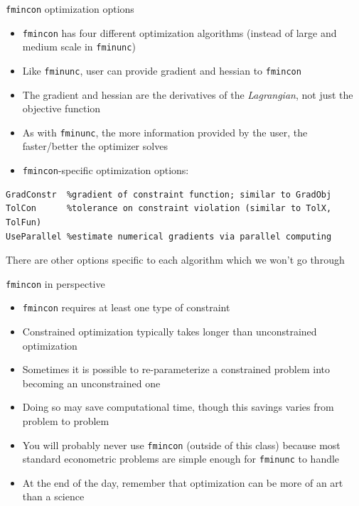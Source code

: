 \documentclass[english,xcolor=dvipsnames]{beamer}
\begin{document}
\begin{frame}[fragile]{\texttt{fmincon} optimization options}
\begin{itemize}
	\item \texttt{fmincon} has four different optimization algorithms (instead of large and medium scale in \texttt{fminunc})
	\item Like \texttt{fminunc}, user can provide gradient and hessian to \texttt{fmincon}
	\item The gradient and hessian are the derivatives of the \emph{Lagrangian}, not just the objective function
	\item As with \texttt{fminunc}, the more information provided by the user, the faster/better the optimizer solves
	\item \texttt{fmincon}-specific optimization options:
\end{itemize}
\begin{lstlisting}
GradConstr  %gradient of constraint function; similar to GradObj
TolCon      %tolerance on constraint violation (similar to TolX, TolFun)
UseParallel %estimate numerical gradients via parallel computing
\end{lstlisting}
There are other options specific to each algorithm which we won't go through
\end{frame}

\begin{frame}[fragile]{\texttt{fmincon} in perspective}
\begin{itemize}
	\item \texttt{fmincon} requires at least one type of constraint
	\item Constrained optimization typically takes longer than unconstrained optimization
	\item Sometimes it is possible to re-parameterize a constrained problem into becoming an unconstrained one
	\item Doing so may save computational time, though this savings varies from problem to problem
	\item You will probably never use \texttt{fmincon} (outside of this class) because most standard econometric problems are simple enough for \texttt{fminunc} to handle
	\item At the end of the day, remember that optimization can be more of an art than a science
\end{itemize}
\end{frame}
\end{document}
